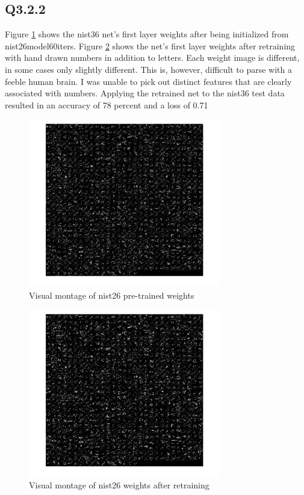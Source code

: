 \documentclass[12pt]{article}
\begin{document}
\subsection{Q3.2.2}
Figure \ref{fig:nist36preweights} shows the nist36 net's first layer weights after being initialized from nist26model60iters. Figure \ref{fig:nist36retrainweights} shows the net's first layer weights after retraining with hand drawn numbers in addition to letters.
Each weight image is different, in some cases only slightly different. This is, however, difficult to parse with a feeble human brain. I was unable to pick out distinct features that are clearly associated with numbers.
Applying the retrained net to the nist36 test data resulted in an accuracy of 78 percent and a loss of 0.71
\begin{figure}[H]
\centering
\includegraphics[page=1,width=0.75\textwidth]{q322_pre}
\caption{ Visual montage of nist26 pre-trained weights } 
\label{fig:nist36preweights}
\end{figure}   

\begin{figure}[H]
\centering
\includegraphics[page=1,width=0.75\textwidth]{q322_retrain}
\caption{ Visual montage of nist26 weights after retraining } 
\label{fig:nist36retrainweights}
\end{figure}   
\end{document}
